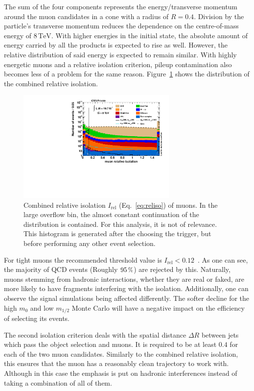The sum of the four components represents the energy/transverse momentum around the muon candidates in a cone with a radius of $R = 0.4$. Division by the particle's transverse momentum reduces the dependence on the centre-of-mass energy of $8\,\text{TeV}$. With higher energies in the initial state, the absolute amount of energy carried by all the products is expected to rise as well. However, the relative distribution of said energy is expected to remain similar. With highly energetic muons and a relative isolation criterion, pileup contamination also becomes less of a problem for the same reason. Figure~\ref{fig:reliso} shows the distribution of the combined relative isolation.

\begin{figure}[ht!]
  \centering
    \includegraphics[width=0.7\textwidth]{plots/reliso.pdf}
  \caption{Combined relative isolation $I_{\text{rel}}$ (Eq.~\ref{eq:reliso}) of muons. In the large overflow bin, the almost constant continuation of the distribution is contained. For this analysis, it is not of relevance. This histogram is generated after the choosing the trigger, but before performing any other event selection.}
  \label{fig:reliso}
\end{figure}

\noindent For tight muons the recommended threshold value is $I_{\text{rel}} < 0.12$~\cite{muonpog}. As one can see, the majority of QCD events (Roughly $95\,\pct$) are rejected by this. Naturally, muons stemming from hadronic interactions, whether they are real or faked, are more likely to have fragments interfering with the isolation. Additionally, one can observe the signal simulations being affected differently. The softer decline for the high $m_0$ and low $m_{1/2}$ Monte Carlo will have a negative impact on the efficiency of selecting its events.

The second isolation criterion deals with the spatial distance $\Delta R$ between jets which pass the object selection and muons. It is required to be at least $0.4$ for each of the two muon candidates. Similarly to the combined relative isolation, this ensures that the muon has a reasonably clean trajectory to work with. Although in this case the emphasis is put on hadronic interferences instead of taking a combination of all of them.

